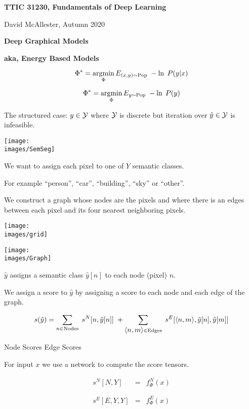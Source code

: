 




{\Huge

  \centerline{\bf TTIC 31230, Fundamentals of Deep Learning}
  \bigskip
  \centerline{David McAllester, Autumn 2020}
  \vfill
  \vfill
  \centerline{\bf Deep Graphical Models}
  \vfill
  \centerline{\bf aka, Energy Based Models}
\vfill
\vfill
\vfill


\vfill
{\color{red}
$$\Phi^* = \operatorname*{argmin}_\Phi E_{(x,y) \sim \mathrm{Pop}}\;-\ln \;P(y|x)$$

\vfill
$$\Phi^* = \operatorname*{argmin}_\Phi E_{y \sim \mathrm{Pop}}\;-\ln \;P(y)$$
}

{\color{red} The structured case:} $y \in {\cal Y}$ where ${\cal Y}$ is discrete but {\color{red} iteration over $\hat{y} \in {\cal Y}$ is infeasible}.
\centerline{\texttt{[image: \\images/SemSeg]}}

\vfill
We want to assign each pixel to one of $Y$ semantic classes.

\vfill
For example ``person'', ``car'', ``building'', ``sky'' or ``other''.


We construct a graph whose nodes are the pixels and where there is an edges between each pixel and its four nearest neighboring pixels.

\vfill
\centerline{\texttt{[image: \\images/grid]}}

\centerline{\texttt{[image: \\images/Graph]}}     
\medskip

$\hat{y} $ assigns a semantic class $\hat{y}[n]$ to each node (pixel) $n$.

\vfill
We assign a score to $\hat{y}$ by assigning a score to each node and each edge of the graph.

{\color{red} $$s(\hat{y}) = \sum_{n \in \mathrm{Nodes}}\; s^N[n,\hat{y}[n]]\; + \sum_{{\mbox{$\langle n,m\rangle$}} \in \mathrm{Edges}}\;s^E[{\mbox{$\langle n,m\rangle$}},\hat{y}[n],\hat{y}[m]]$$}
\centerline{Node Scores \hspace{6em}Edge Scores \hspace{3em}~}


For input $x$ we use a network to compute the score tensors.

\vfill
\begin{eqnarray*}
s^N[N,Y] & = & f^N_\Phi(x) \\
\\
\\
s^E[E,Y,Y] & = & f^E_\Phi(x)
\end{eqnarray*}

}
